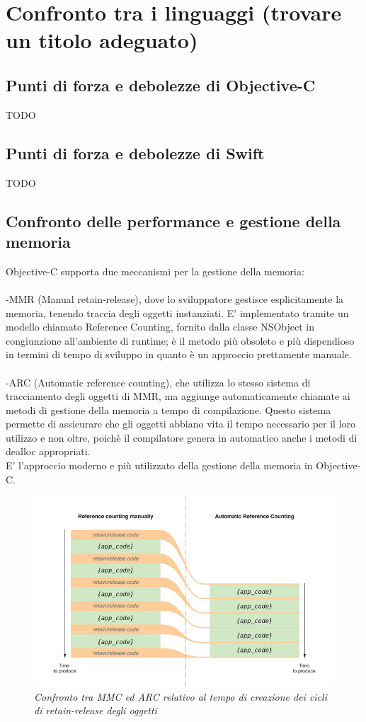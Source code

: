 \chapter{Confronto tra i linguaggi (trovare un titolo adeguato)}

\section{Punti di forza e debolezze di Objective-C}
TODO
\section{Punti di forza e debolezze di Swift}
TODO
\section{Confronto delle performance e gestione della memoria}
Objective-C supporta due meccanismi per la gestione della memoria:\\
\\-MMR (Manual retain-release), dove lo sviluppatore gestisce esplicitamente la memoria, tenendo traccia degli oggetti instanziati. E' implementato tramite un modello chiamato Reference Counting, fornito dalla classe NSObject in congiunzione all'ambiente di runtime; è il metodo più obsoleto e più dispendioso in termini di tempo di sviluppo in quanto è un approccio prettamente manuale.\\
\\-ARC (Automatic reference counting), che utilizza lo stesso sistema di tracciamento degli oggetti di MMR, ma aggiunge automaticamente chiamate ai metodi di gestione della memoria a tempo di compilazione. Questo sistema permette di assicurare che gli oggetti abbiano vita il tempo necessario per il loro utilizzo e non oltre, poichè il compilatore genera in automatico anche i metodi di dealloc appropriati.\\E' l'approccio moderno e più utilizzato della gestione della memoria in Objective-C.
\begin{figure}
      \centering
      \includegraphics[scale=0.40]{immagini/ARC.jpg}
            \vspace{0.8cm}
            \caption{\textit{Confronto tra MMC ed ARC relativo al tempo di creazione dei cicli di retain-release degli oggetti}}
    \end{figure}
